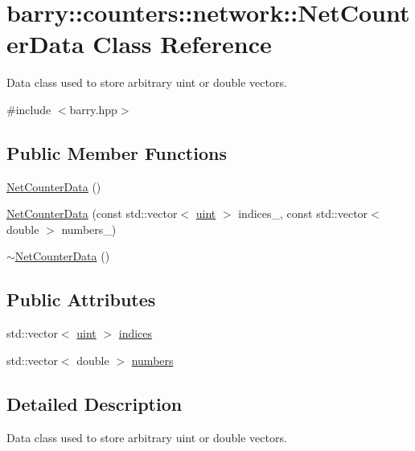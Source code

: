 \hypertarget{classbarry_1_1counters_1_1network_1_1_net_counter_data}{}\section{barry\+:\+:counters\+:\+:network\+:\+:Net\+Counter\+Data Class Reference}
\label{classbarry_1_1counters_1_1network_1_1_net_counter_data}


Data class used to store arbitrary uint or double vectors.  




{\ttfamily \#include $<$barry.\+hpp$>$}

\subsection*{Public Member Functions}
\begin{DoxyCompactItemize}
\item 
\hyperlink{classbarry_1_1counters_1_1network_1_1_net_counter_data_a1fef852e8037b9334988e4df719d2e30}{Net\+Counter\+Data} ()
\item 
\hyperlink{classbarry_1_1counters_1_1network_1_1_net_counter_data_aec809349144f7b82fd0866ba89df1413}{Net\+Counter\+Data} (const std\+::vector$<$ \hyperlink{namespacebarry_a11dfc53ddb4672278319aa04f1e09a6c}{uint} $>$ indices\+\_\+, const std\+::vector$<$ double $>$ numbers\+\_\+)
\item 
\hyperlink{classbarry_1_1counters_1_1network_1_1_net_counter_data_ac2bfc760b63c81a8f6c316b338e95944}{$\sim$\+Net\+Counter\+Data} ()
\end{DoxyCompactItemize}
\subsection*{Public Attributes}
\begin{DoxyCompactItemize}
\item 
std\+::vector$<$ \hyperlink{namespacebarry_a11dfc53ddb4672278319aa04f1e09a6c}{uint} $>$ \hyperlink{classbarry_1_1counters_1_1network_1_1_net_counter_data_a2fb56e7f412a813c45cf1a3d5439a017}{indices}
\item 
std\+::vector$<$ double $>$ \hyperlink{classbarry_1_1counters_1_1network_1_1_net_counter_data_a720381c090feafdf9652f0ca19c5cc4b}{numbers}
\end{DoxyCompactItemize}


\subsection{Detailed Description}
Data class used to store arbitrary uint or double vectors. 


